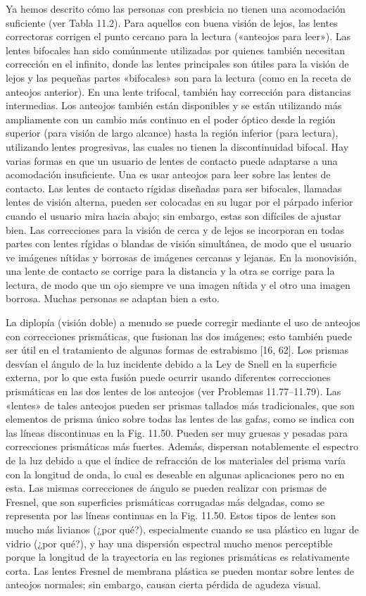 \documentclass[12pt]{book}
\begin{document}
Ya hemos descrito cómo las personas con presbicia no tienen una acomodación suficiente (ver Tabla 11.2). Para aquellos con buena visión de lejos, las lentes correctoras corrigen el punto cercano para la lectura («anteojos para leer»). Las lentes bifocales han sido comúnmente utilizadas por quienes también necesitan corrección en el infinito, donde las lentes principales son útiles para la visión de lejos y las pequeñas partes «bifocales» son para la lectura (como en la receta de anteojos anterior). En una lente trifocal, también hay corrección para distancias intermedias. Los anteojos también están disponibles y se están utilizando más ampliamente con un cambio más continuo en el poder óptico desde la región superior (para visión de largo alcance) hasta la región inferior (para lectura), utilizando lentes progresivas, las cuales no tienen la discontinuidad bifocal. Hay varias formas en que un usuario de lentes de contacto puede adaptarse a una acomodación insuficiente. Una es usar anteojos para leer sobre las lentes de contacto. Las lentes de contacto rígidas diseñadas para ser bifocales, llamadas lentes de visión alterna, pueden ser colocadas en su lugar por el párpado inferior cuando el usuario mira hacia abajo; sin embargo, estas son difíciles de ajustar bien. Las correcciones para la visión de cerca y de lejos se incorporan en todas partes con lentes rígidas o blandas de visión simultánea, de modo que el usuario ve imágenes nítidas y borrosas de imágenes cercanas y lejanas. En la monovisión, una lente de contacto se corrige para la distancia y la otra se corrige para la lectura, de modo que un ojo siempre ve una imagen nítida y el otro una imagen borrosa. Muchas personas se adaptan bien a esto.

La diplopía (visión doble) a menudo se puede corregir mediante el uso de anteojos con correcciones prismáticas, que fusionan las dos imágenes; esto también puede ser útil en el tratamiento de algunas formas de estrabismo [16, 62]. Los prismas desvían el ángulo de la luz incidente debido a la Ley de Snell en la superficie externa, por lo que esta fusión puede ocurrir usando diferentes correcciones prismáticas en las dos lentes de los anteojos (ver Problemas 11.77--11.79). Las «lentes» de tales anteojos pueden ser prismas tallados más tradicionales, que son elementos de prisma único sobre todas las lentes de las gafas, como se indica con las líneas discontinuas en la Fig. 11.50. Pueden ser muy gruesas y pesadas para correcciones prismáticas más fuertes. Además, dispersan notablemente el espectro de la luz debido a que el índice de refracción de los materiales del prisma varía con la longitud de onda, lo cual es deseable en algunas aplicaciones pero no en esta. Las mismas correcciones de ángulo se pueden realizar con prismas de Fresnel, que son superficies prismáticas corrugadas más delgadas, como se representa por las líneas continuas en la Fig. 11.50. Estos tipos de lentes son mucho más livianos (¿por qué?), especialmente cuando se usa plástico en lugar de vidrio (¿por qué?), y hay una dispersión espectral mucho menos perceptible porque la longitud de la trayectoria en las regiones prismáticas es relativamente corta. Las lentes Fresnel de membrana plástica se pueden montar sobre lentes de anteojos normales; sin embargo, causan cierta pérdida de agudeza visual.
\end{document}
